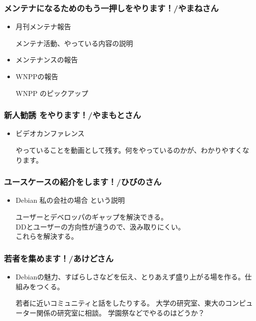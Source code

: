 \documentclass[mingoth,a4paper]{jsarticle}
\begin{document}
\subsubsection{メンテナになるためのもう一押しをやります！/やまねさん}
\begin{itemize}
    \item 月刊メンテナ報告
          
	メンテナ活動、やっている内容の説明

    \item メンテナンスの報告
    \item WNPPの報告

	WNPP のピックアップ
\end{itemize}

\subsubsection{新人勧誘 をやります！/やまもとさん}
\begin{itemize}
    \item ビデオカンファレンス
          
	やっていることを動画として残す。何をやっているのかが、わかりやすくなります。
\end{itemize}

\subsubsection{ユースケースの紹介をします！/ひびのさん}
\begin{itemize}
    \item Debian 私の会社の場合 という説明

	ユーザーとデベロッパのギャップを解決できる。\\
	DDとユーザーの方向性が違うので、汲み取りにくい。\\
	これらを解決する。\\
\end{itemize}

\subsubsection{若者を集めます！/あけどさん}
\begin{itemize}
    \item Debianの魅力、すばらしさなどを伝え、とりあえず盛り上がる場を作る。仕組みをつくる。
	
	若者に近いコミュニティと話をしたりする。
	大学の研究室、東大のコンピューター関係の研究室に相談。
	学園祭などでやるのはどうか？
\end{itemize}
	
\end{document}
